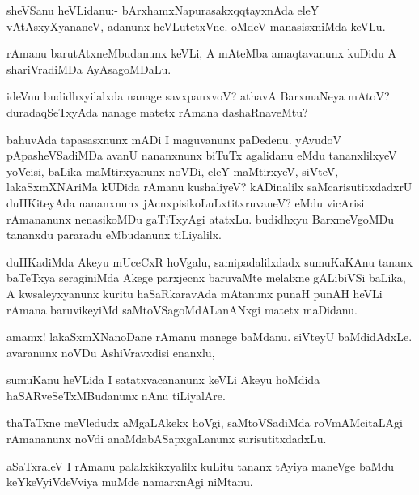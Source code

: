\documentclass{article}
\begin{document}
\begin{mn}%
sheVSanu heVLidanu:- bArxhamxNapurasakxqqtayxnAda eleY vAtAsxyXyananeV, adanunx 
heVLutetxVne. oMdeV manasisxniMda keVLu.
\end{mn}

\begin{mn}%
rAmanu barutAtxneMbudanunx keVLi, A mAteMba amaqtavanunx kuDidu A shariVradiMDa AyAsagoMDaLu.
\end{mn}

\begin{mn}%
ideVnu budidhxyilalxda nanage savxpanxvoV? athavA BarxmaNeya mAtoV? duradaqSeTxyAda nanage 
matetx rAmana dashaRnaveMtu?
\end{mn}

\begin{mn}%
bahuvAda tapasasxnunx mADi I maguvanunx paDedenu. yAvudoV pApasheVSadiMDa avanU nananxnunx 
biTuTx agalidanu eMdu tananxlilxyeV yoVcisi, baLika maMtirxyanunx noVDi, eleY maMtirxyeV, 
siVteV, lakaSxmXNAriMa kUDida rAmanu kushaliyeV? kADinalilx saMcarisutitxdadxrU duHKiteyAda 
nananxnunx jAcnxpisikoLuLxtitxruvaneV? eMdu vicArisi rAmananunx nenasikoMDu gaTiTxyAgi 
atatxLu. budidhxyu BarxmeVgoMDu tananxdu pararadu eMbudanunx tiLiyalilx.
\end{mn}

\begin{mn}%
duHKadiMda Akeyu mUceCxR hoVgalu, samipadalilxdadx sumuKaKAnu tananx baTeTxya seraginiMda 
Akege parxjecnx baruvaMte melalxne gALibiVSi baLika, A kwsaleyxyanunx kuritu haSaRkaravAda 
mAtanunx  punaH punAH heVLi rAmana baruvikeyiMd saMtoVSagoMdALanANxgi matetx maDidanu.
\end{mn}

\begin{mn}%
amamx! lakaSxmXNanoDane rAmanu manege baMdanu. siVteyU baMdidAdxLe. avaranunx noVDu 
AshiVravxdisi enanxlu,
\end{mn}

\begin{mn}%
sumuKanu heVLida I satatxvacananunx keVLi Akeyu hoMdida haSARveSeTxMBudanunx nAnu tiLiyalAre.
\end{mn}

\begin{mn}%
thaTaTxne meVledudx aMgaLAkekx hoVgi, saMtoVSadiMda roVmAMcitaLAgi rAmananunx noVdi 
anaMdabASapxgaLanunx surisutitxdadxLu.
\end{mn}

\begin{mn}%
aSaTxraleV I rAmanu palalxkikxyalilx kuLitu tananx tAyiya maneVge baMdu keYkeVyiVdeVviya 
muMde namarxnAgi niMtanu.
\end{mn}
\end{document}
